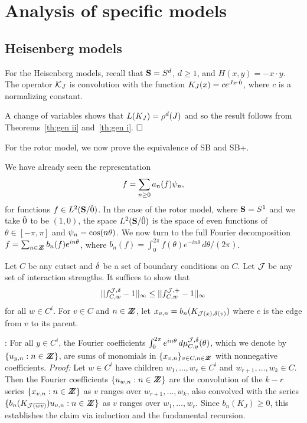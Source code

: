 \setcounter{equation}{0}

\section{Analysis of specific models} \label{sec:anal}


\subsection{Heisenberg models} \label{sub:spherical}

For the Heisenberg models, recall that $\S = S^d$, $d \geq 1$,
and $H(x,y) = - x \cdot y$.  The operator $\KJ$ is convolution
with the function $K_J (x) = c e^{ J x \cdot \zero}$, where $c$ is 
a normalizing constant.  

A change of variables shows that $L(K_J)=\calrdJ$ and so the result follows
from Theorems~\ref{th:gen ii} and~\ref{th:gen i}. $\qed$

For the rotor model, we now prove the equivalence of SB and SB+.  

We have already seen the representation 
$$f = \sum_{n \geq 0} a_n (f) \f_n, $$
for functions $f \in \ltsg$.  In the case of the rotor model, where
$\S = S^1$ and we take $\zero$ to be $(1,0)$, 
the space $\ltsg$ is the space of even functions of
$\theta \in [-\pi , \pi]$ and $\f_n = \cos (n \theta)$.  We now
turn to the full Fourier decomposition $f = \sum_{n \in \Z} b_n (f) 
e^{i n \theta}$, where $b_n (f) = \int_0^{2\pi} f(\theta) e^{-i n \theta} \,
d\theta/ (2 \pi)$.  

Let $C$ be any cutset and $\p$ be a set of boundary conditions on $C$.
Let $\J$ be any set of interaction strengths.  It suffices to show that 
$$||f^{\J , \p}_{C,w} - 1||_\infty \leq ||f^{\J , +}_{C,w}-1||_\infty$$
for all $w\in C^i$.
For $v \in C$ and $n\in \Z$, let $x_{v,n} = b_n (K_{\J(x) , \p (v)})$
where $e$ is the edge from $v$ to its parent.  

: For all $y\in C^i$, the
Fourier coefficients $\int_0^{2\pi} e^{i n \theta}
\, d\mu^{\J , \p}_{C,y}(\theta)$, which we denote by 
$\{ u_{y , n} : n \in \Z \}$, are sums of monomials in 
$\{ x_{v,n} \}_{v\in C, n\in\Z}$ with
nonnegative coefficients.  {\it Proof:} Let $w \in C^i$ have children
$w_1 , \ldots , w_r \in C^i$ and $w_{r+1} , \ldots , w_k \in C$.
Then the Fourier coefficients $\{ u_{w,n} : n \in \Z \}$ 
are the convolution of the $k - r$ series $\{ x_{v , n} : n \in \Z \}$ 
as $v$ ranges over $w_{r+1} , \ldots , w_k$, also convolved with the
series $\{ b_n (K_{\J (\overline{wv})}) u_{v,n} : n \in \Z \}$ as $v$
ranges over $w_1 , \ldots , w_r$.  Since $b_n (K_J) \geq 0$, this
establishes the claim via induction and the fundamental recursion.

